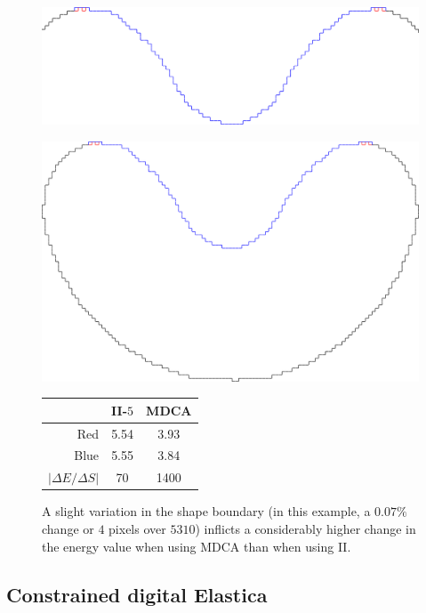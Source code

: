 \begin{figure}[]
\begin{minipage}[b]{0.6\textwidth}
\center
\includegraphics[scale=0.15]{figures/chapter5/mdca-sensitivity/closer-picture.pdf}
\end{minipage}%
\begin{minipage}[b]{0.4\textwidth}
\center
\includegraphics[scale=0.025]{figures/chapter5/mdca-sensitivity/big-picture.pdf}\\\vspace{2em}
\captionsetup{type=table}
\begin{tabular}{r|c|c}
& II-$5$ & MDCA \\
\hline
Red  & 5.54 & 3.93\\
Blue & 5.55 & 3.84\\
\hline
$| \Delta E / \Delta S |$ & 70 & 1400
\end{tabular}
\end{minipage}
\caption{A slight variation in the shape boundary (in this example, a $0.07\%$ change or $4$ pixels over $5310$) inflicts a considerably higher change in the energy value when using MDCA than when using II. }
\label{fig:mdca-sensitivity}
\end{figure}

\subsection{Constrained digital Elastica}
\label{ch6:subsec:constrained-digital-elastica}

